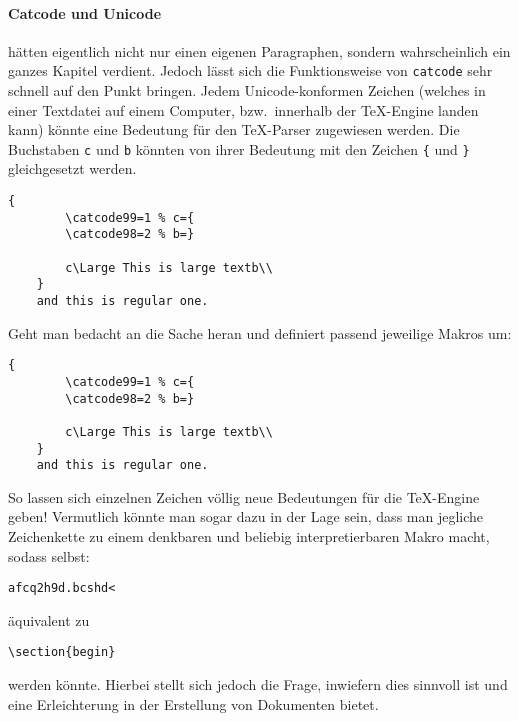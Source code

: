 \paragraph*{Catcode und Unicode}\label{par:catcode} hätten eigentlich nicht nur einen eigenen Paragraphen, sondern wahrscheinlich ein ganzes Kapitel verdient. Jedoch lässt sich die Funktionsweise von \texttt{catcode} sehr schnell auf den Punkt bringen. Jedem Unicode-konformen Zeichen (welches in einer Textdatei auf einem Computer, bzw.\ innerhalb der \TeX{}-Engine landen kann) könnte eine Bedeutung für den \TeX{}-Parser zugewiesen werden. Die Buchstaben \texttt{c} und \texttt{b} könnten von ihrer Bedeutung mit den Zeichen \verb|{| und \verb|}| gleichgesetzt werden. 
\begin{Verbatim}[breaklines=true, breakanywhere=true]
    {
        \catcode99=1 % c={
        \catcode98=2 % b=}
    
        c\Large This is large textb\\
    }
    and this is regular one.
\end{Verbatim}
Geht man bedacht an die Sache heran und definiert passend jeweilige Makros um:
\begin{Verbatim}[breaklines=true, breakanywhere=true]
    {
        \catcode99=1 % c={
        \catcode98=2 % b=}
    
        c\Large This is large textb\\
    }
    and this is regular one.
\end{Verbatim}
So lassen sich einzelnen Zeichen völlig neue Bedeutungen für die \TeX{}-Engine geben! Vermutlich könnte man sogar dazu in der Lage sein, dass man jegliche Zeichenkette zu einem denkbaren und beliebig interpretierbaren Makro macht, sodass selbst:
\begin{Verbatim}[breaklines=true, breakanywhere=true]
    afcq2h9d.bcshd<
\end{Verbatim} 
äquivalent zu 
\begin{Verbatim}[breaklines=true, breakanywhere=true]
    \section{begin}
\end{Verbatim} 
werden könnte. Hierbei stellt sich jedoch die Frage, inwiefern dies sinnvoll ist und eine Erleichterung in der Erstellung von Dokumenten bietet.














